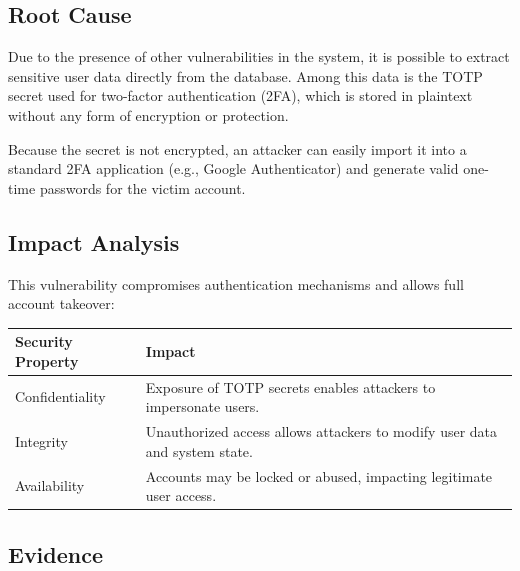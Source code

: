 \documentclass[11pt,a4paper]{report}
\begin{document}
        \vspace{0.4cm}

        \subsection{Root Cause}

        Due to the presence of other vulnerabilities in the system, it is possible to extract sensitive user data directly from the database. Among this data is the TOTP secret used for two-factor authentication (2FA), which is stored in plaintext without any form of encryption or protection.

        Because the secret is not encrypted, an attacker can easily import it into a standard 2FA application (e.g., Google Authenticator) and generate valid one-time passwords for the victim account.

        \vspace{0.3cm}

        \subsection{Impact Analysis}

        This vulnerability compromises authentication mechanisms and allows full account takeover:

        \begin{longtable}{|p{4cm}|p{10cm}|}
        \hline
        \rowcolor{lightgray}
        \textbf{Security Property} & \textbf{Impact} \\
        \hline

        Confidentiality & Exposure of TOTP secrets enables attackers to impersonate users. \\
        \hline

        Integrity & Unauthorized access allows attackers to modify user data and system state. \\
        \hline

        Availability & Accounts may be locked or abused, impacting legitimate user access. \\
        \hline

        \end{longtable}

        \vspace{0.3cm}

        \subsection{Evidence}
\end{document}
